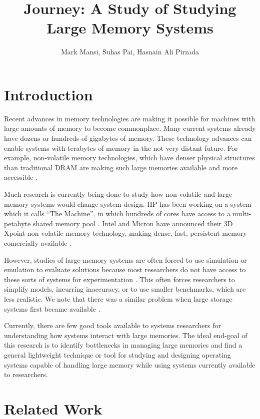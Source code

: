 \documentclass[twocolumn,11pt]{article}
\title{Journey: A Study of Studying Large Memory Systems}
\author{Mark Mansi, Suhas Pai, Hasnain Ali Pirzada}
\date{}
\begin{document}
\maketitle

\section{Introduction}

Recent advances in memory technologies are making it possible for machines with
large amounts of memory to become commonplace. Many current systems already
have dozens or hundreds of gigabytes of memory. These technology advances can
enable systems with terabytes of memory in the not very distant future. For
example, non-volatile memory technologies, which have denser physical
structures than traditional DRAM are making such large memories available and
more accessible \cite{xpoint}.

Much research is currently being done to study how non-volatile and large
memory systems would change system design. HP has been working on a system
which it calls ``The Machine'', in which hundreds of cores have access to a
multi-petabyte shared memory pool \cite{hp_machine}. Intel and
Micron have announced their 3D Xpoint non-volatile memory technology, making
dense, fast, persistent memory comercially available \cite{xpoint}.

However, studies of large-memory systems are often forced to use simulation or
emulation to evaluate solutions because most researchers do not have access to
these sorts of systems for experimentation \cite{quartz}. This often
forces researchers to simplify models, incurring inaccuracy, or to use smaller
benchmarks, which are less realistic. We note that there was a similar problem
when large storage systems first became available \cite{david, exalt}.

Currently, there are few good tools available to systems researchers for
understanding how systems interact with large memories. The ideal end-goal of
this research is to identify bottlenecks in managing large memories and find a
general lightweight technique or tool for studying and designing operating
systems capable of handling large memory while using systems currently
available to researchers.

\section{Related Work}
\end{document}
